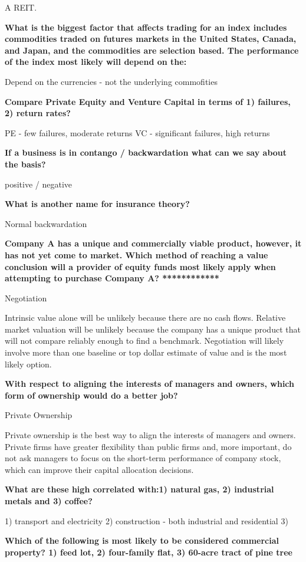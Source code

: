 \documentclass[12pt]{article}
\begin{document}
\begin{framed}
\begin{framed}
A REIT.

\textbf{What is the biggest factor that affects trading for an index includes commodities traded on futures markets in the United States, Canada, and Japan, and the commodities are selection based. The performance of the index most likely will depend on the:}

Depend on the currencies - not the underlying commofities

\textbf{Compare Private Equity and Venture Capital in terms of 1) failures, 2) return rates?}

PE - few failures, moderate returns
VC - significant failures, high returns

\textbf{If a business is in contango / backwardation what can we say about the basis?}

positive / negative

\textbf{What is another name for insurance theory?}

Normal backwardation

\textbf{Company A has a unique and commercially viable product, however, it has not yet come to market. Which method of reaching a value conclusion will a provider of equity funds most likely apply when attempting to purchase Company A? ************}

Negotiation

Intrinsic value alone will be unlikely because there are no cash flows. Relative market valuation will be unlikely because the company has a unique product that will not compare reliably enough to find a benchmark. Negotiation will likely involve more than one baseline or top dollar estimate of value and is the most likely option.


\textbf{With respect to aligning the interests of managers and owners, which form of ownership would do a better job?}

Private Ownership

Private ownership is the best way to align the interests of managers and owners. Private firms have greater flexibility than public firms and, more important, do not ask managers to focus on the short-term performance of company stock, which can improve their capital allocation decisions.

\textbf{What are these high correlated with:1) natural gas, 2) industrial metals and 3) coffee?}

1) transport and electricity
2) construction - both industrial and residential
3) 

\textbf{Which of the following is most likely to be considered commercial property? 1) feed lot, 2) four-family flat, 3) 60-acre tract of pine tree}


\end{framed}
\end{framed}
\end{document}
